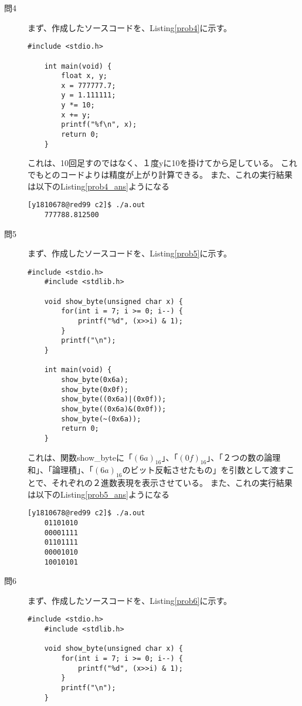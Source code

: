 \documentclass{jsarticle}
\begin{document}
\begin{description}
    \item[問4]
    まず、作成したソースコードを、Listing\ref{prob4}に示す。
    \begin{lstlisting}[caption=問4のソースコード, label=prob4]
    #include <stdio.h>

    int main(void) {
        float x, y;
        x = 777777.7;
        y = 1.111111;
        y *= 10;
        x += y;
        printf("%f\n", x);
        return 0;
    }
    \end{lstlisting}
    これは、10回足すのではなく、１度yに10を掛けてから足している。
    これでもとのコードよりは精度が上がり計算できる。
    また、これの実行結果は以下のListing\ref{prob4_ans}ようになる
    \begin{lstlisting}[caption=問4の実行結果, label=prob4_ans]
    [y1810678@red99 c2]$ ./a.out
    777788.812500
    \end{lstlisting}

    \item[問5]
    まず、作成したソースコードを、Listing\ref{prob5}に示す。
    \begin{lstlisting}[caption=問5のソースコード, label=prob5]
    #include <stdio.h>
    #include <stdlib.h>

    void show_byte(unsigned char x) {
        for(int i = 7; i >= 0; i--) {
            printf("%d", (x>>i) & 1);
        }
        printf("\n");
    }

    int main(void) {
        show_byte(0x6a);
        show_byte(0x0f);
        show_byte((0x6a)|(0x0f));
        show_byte((0x6a)&(0x0f));
        show_byte(~(0x6a));
        return 0;
    }
    \end{lstlisting}
    これは、関数show\_byteに「$(6a)_{16}$」、「$(0f)_{16}$」、「２つの数の論理和」、「論理積」、「$(6a)_{16}$のビット反転させたもの」を引数として渡すことで、それぞれの２進数表現を表示させている。
    また、これの実行結果は以下のListing\ref{prob5_ans}ようになる
    \begin{lstlisting}[caption=問5の実行結果, label=prob5_ans]
    [y1810678@red99 c2]$ ./a.out
    01101010
    00001111
    01101111
    00001010
    10010101
    \end{lstlisting}

    \item[問6]
    まず、作成したソースコードを、Listing\ref{prob6}に示す。
    \begin{lstlisting}[caption=問6のソースコード, label=prob6]
    #include <stdio.h>
    #include <stdlib.h>

    void show_byte(unsigned char x) {
        for(int i = 7; i >= 0; i--) {
            printf("%d", (x>>i) & 1);
        }
        printf("\n");
    }


\end{lstlisting}
\end{description}
\end{document}
